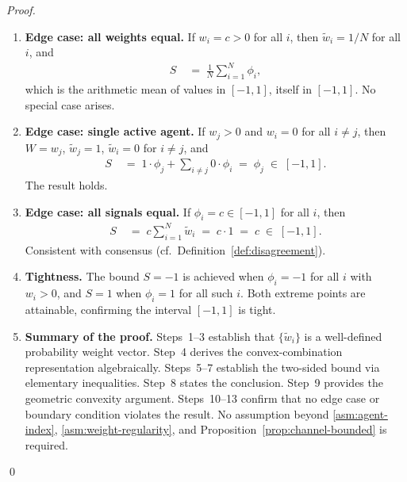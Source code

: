 \documentclass[12pt,openany]{book}
\numberwithin{equation}{chapter}
\theoremstyle{plain}
\theoremstyle{definition}
\theoremstyle{remark}
\numberwithin{equation}{chapter}
\theoremstyle{plain}
\begin{document}
\begin{proof}
\begin{enumerate}
  \item \textbf{Edge case: all weights equal.}
        If $w_i = c > 0$ for all $i$, then
        $\tilde{w}_i = 1/N$ for all $i$, and
        \begin{align}
          S
          &\;=\; \frac{1}{N}\sum_{i=1}^{N}\phi_i,
        \end{align}
        which is the arithmetic mean of values in $[-1,1]$,
        itself in $[-1,1]$.  No special case arises.

  \item \textbf{Edge case: single active agent.}
        If $w_j > 0$ and $w_i = 0$ for all $i \neq j$,
        then $W = w_j$, $\tilde{w}_j = 1$,
        $\tilde{w}_i = 0$ for $i \neq j$, and
        \begin{align}
          S
          &\;=\; 1 \cdot \phi_j + \sum_{i \neq j} 0 \cdot \phi_i
          \;=\; \phi_j
          \;\in\; [-1,1].
        \end{align}
        The result holds.

  \item \textbf{Edge case: all signals equal.}
        If $\phi_i = c \in [-1,1]$ for all $i$, then
        \begin{align}
          S
          &\;=\; c \sum_{i=1}^{N}\tilde{w}_i
          \;=\; c \cdot 1
          \;=\; c
          \;\in\; [-1,1].
        \end{align}
        Consistent with consensus (cf.\
        Definition~\ref{def:disagreement}).

  \item \textbf{Tightness.}
        The bound $S = -1$ is achieved when
        $\phi_i = -1$ for all $i$ with $w_i > 0$, and
        $S = 1$ when $\phi_i = 1$ for all such $i$.
        Both extreme points are attainable, confirming the
        interval $[-1,1]$ is tight.

  \item \textbf{Summary of the proof.}
        Steps~1--3 establish that $\{\tilde{w}_i\}$ is a
        well-defined probability weight vector.
        Step~4 derives the convex-combination representation
        algebraically.
        Steps~5--7 establish the two-sided bound via
        elementary inequalities.
        Step~8 states the conclusion.
        Step~9 provides the geometric convexity argument.
        Steps~10--13 confirm that no edge case or boundary
        condition violates the result.
        No assumption beyond
        \ref{asm:agent-index},
        \ref{asm:weight-regularity}, and
        Proposition~\ref{prop:channel-bounded} is required.

\end{enumerate}
\qed
\end{proof}
\end{document}
